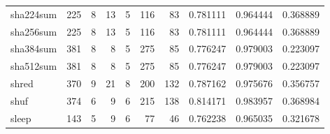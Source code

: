 \begin{tabular}{lrrrrrrrrr}
sha224sum &                    225 &                                  8 &                                13 &                                5 &                               116 &                              83 &                                0.781111 &                               0.964444 &                             0.368889 \\
sha256sum &                    225 &                                  8 &                                13 &                                5 &                               116 &                              83 &                                0.781111 &                               0.964444 &                             0.368889 \\
sha384sum &                    381 &                                  8 &                                 8 &                                5 &                               275 &                              85 &                                0.776247 &                               0.979003 &                             0.223097 \\
sha512sum &                    381 &                                  8 &                                 8 &                                5 &                               275 &                              85 &                                0.776247 &                               0.979003 &                             0.223097 \\
shred     &                    370 &                                  9 &                                21 &                                8 &                               200 &                             132 &                                0.787162 &                               0.975676 &                             0.356757 \\
shuf      &                    374 &                                  6 &                                 9 &                                6 &                               215 &                             138 &                                0.814171 &                               0.983957 &                             0.368984 \\
sleep     &                    143 &                                  5 &                                 9 &                                6 &                                77 &                              46 &                                0.762238 &                               0.965035 &                             0.321678 \\

\end{tabular}
